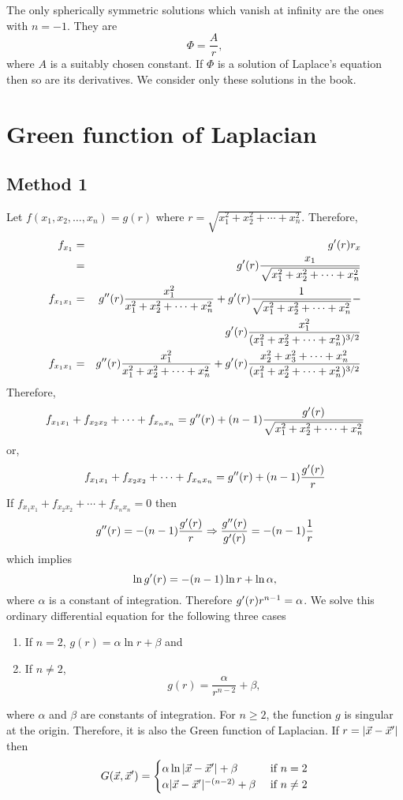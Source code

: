 The only spherically symmetric solutions which vanish at infinity are the ones with $n = -1$. They are
\[
\Phi = \frac{A}{r},
\]
where $A$ is a suitably chosen constant. If $\Phi$ is a solution of Laplace's equation then so are its derivatives. We consider only these solutions in the book.

\section{Green function of Laplacian}
\subsection{Method 1}\label{c2sa6} 
Let $f(x_1, x_2, \ldots, x_n) = g(r)$ where $r = \sqrt{x_1^2 + x_2^2 + \cdots + x_n^2}$. Therefore,
\begin{eqnarray*}
f_{x_1}    &=& g^\prime(r) r_x \\
		  &=& g^\prime(r)\frac{x_1}{\sqrt{x_1^2 + x_2^2 + \cdots + x_n^2}} \\
f_{x_1x_1} &=& g^{\prime\prime}(r)\frac{x_1^2}{x_1^2 + x_2^2 + \cdots + x_n^2} + g^\prime(r)\frac{1}{\sqrt{x_1^2 + x_2^2 + \cdots + x_n^2}} - \\
           & & g^\prime(r)\frac{x_1^2}{(x_1^2 + x_2^2 + \cdots + x_n^2)^{3/2}} \\
f_{x_1x_1} &=& g^{\prime\prime}(r)\frac{x_1^2}{x_1^2 + x_2^2 + \cdots + x_n^2} + g^\prime(r)\frac{x_2^2 + x_3^2 + \cdots + x_n^2}{(x_1^2 + x_2^2 + \cdots + x_n^2)^{3/2}} \\
\end{eqnarray*}
Therefore,
\[
f_{x_1x_1} + f_{x_2x_2} + \cdots + f_{x_nx_n} = g^{\prime\prime}(r) + (n - 1)\frac{g^\prime(r)}{\sqrt{x_1^2 + x_2^2 + \cdots + x_n^2}} 
\]
or,
\[
f_{x_1x_1} + f_{x_2x_2} + \cdots + f_{x_nx_n} = g^{\prime\prime}(r) + (n - 1)\frac{g^\prime(r)}{r} 
\]
If $f_{x_1x_1} + f_{x_2x_2} + \cdots + f_{x_nx_n} = 0$ then 
\[
g^{\prime\prime}(r) = -(n - 1)\frac{g^\prime(r)}{r} \Rightarrow \frac{g^{\prime\prime}(r)}{g^\prime(r)} = -(n - 1)\frac{1}{r}
\]
which implies
\[
\ln g^\prime(r) = -(n - 1)\ln r + \ln\alpha,
\]
where $\alpha$ is a constant of integration. Therefore $g^\prime(r)r^{n - 1} = \alpha$. We solve this ordinary differential equation for the following three cases
\begin{enumerate}
\item If $n = 2$, $g(r) = \alpha\ln r + \beta$ and
\item If $n \ne 2$, 
\[
g(r) = \frac{\alpha}{r^{n - 2}} + \beta,
\]
\end{enumerate}
where $\alpha$ and $\beta$ are constants of integration. For $n \ge 2$, the function $g$ is singular at the origin. Therefore, it is also the Green function of Laplacian. If 
$r = |\vec{x} - \vec{x}^\prime|$ then
\[
G(\vec{x}, \vec{x}^\prime) = \begin{cases}
\alpha\ln|\vec{x} - \vec{x}^\prime| + \beta & \text{ if } n = 2 \\
\alpha|\vec{x} - \vec{x}^\prime|^{-(n - 2)} + \beta & \text{ if } n \ne 2
\end{cases}
\]
 
